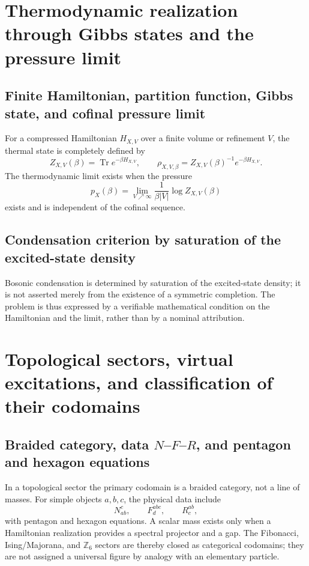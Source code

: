 \section{Thermodynamic realization through Gibbs states and the pressure limit}

\subsection{Finite Hamiltonian, partition function, Gibbs state, and cofinal pressure limit}

For a compressed Hamiltonian \(H_{X,V}\) over a finite volume or refinement
\(V\), the thermal state is completely defined by
\[
 Z_{X,V}(\beta)=\operatorname{Tr}e^{-\beta H_{X,V}},
 \qquad
 \rho_{X,V,\beta}=Z_{X,V}(\beta)^{-1}e^{-\beta H_{X,V}}.
\]
The thermodynamic limit exists when the pressure
\[
 p_X(\beta)=\lim_{V\nearrow\infty}
 \frac1{\beta |V|}\log Z_{X,V}(\beta)
\]
exists and is independent of the cofinal sequence.

\subsection{Condensation criterion by saturation of the excited-state density}

Bosonic condensation is
determined by saturation of the excited-state density; it is not asserted
merely from the existence of a symmetric completion. The problem
is thus expressed by a verifiable mathematical condition on the
Hamiltonian and the limit, rather than by a nominal attribution.

\section{Topological sectors, virtual excitations, and classification of their codomains}

\subsection{Braided category, data \texorpdfstring{\(N\)--\(F\)--\(R\)}{N--F--R}, and pentagon and hexagon equations}

In a topological sector the primary codomain is a braided category, not
a line of masses. For simple objects \(a,b,c\), the physical data include
\[
 N_{ab}^{c},\qquad F^{abc}_{d},\qquad R^{ab}_{c},
\]
with pentagon and hexagon equations. A scalar mass exists only
when a Hamiltonian realization provides a spectral projector and a
gap. The Fibonacci, Ising/Majorana, and \(\mathbb Z_6\) sectors are thereby
closed as categorical codomains; they are not assigned a universal figure
by analogy with an elementary particle.

